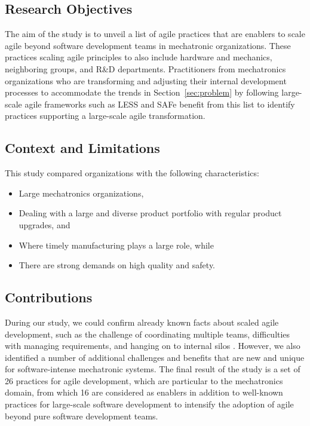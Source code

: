 \documentclass[10pt,a4paper]{IEEEtran} %
\begin{document}
\subsection{Research Objectives}
The aim of the study is to unveil a list of agile practices that are 
enablers to scale agile beyond software development teams in mechatronic organizations. These practices 
scaling agile principles to also include
hardware and mechanics, neighboring groups, and R\&D departments.
Practitioners from mechatronics organizations who are transforming and adjusting their
internal development processes to  accommodate the trends in Section~\ref{sec:problem}
by following large-scale agile frameworks
such as LESS and SAFe \cite{larman_large-scale_2016,larman_large-scale_2014,leffingwell_scaled_????,brenner_scaled_2015}
benefit from this list to identify practices 
supporting a large-scale agile transformation.  


\subsection{Context and Limitations}

This study compared organizations with the following characteristics:
\begin{itemize}
\item Large mechatronics organizations,
\item Dealing with a large and diverse product portfolio with regular product upgrades, and
\item Where timely manufacturing plays a large role, while
\item There are strong demands on high quality and safety.
\end{itemize}


\subsection{Contributions}

During our study, we could confirm already known facts about scaled agile development,
such as the challenge of coordinating multiple teams, difficulties with managing requirements,
and hanging on to internal silos \cite{dikert_challenges_2016}.
However, we also identified a number of additional challenges and benefits that are new
and unique for software-intense mechatronic systems. 
The final result of the study is a set of 26 practices for agile development, which
are particular to the mechatronics domain, from which 16 are considered as enablers
in addition to well-known practices for large-scale software development to intensify
the adoption of agile beyond pure software development teams.
\end{document}
